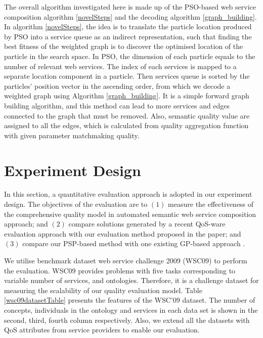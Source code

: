 \documentclass{llncs}
\begin{document}
The overall algorithm investigated here is made up of the PSO-based web service composition algorithm \ref{novelSteps} and the decoding algorithm \ref{graph_building}. In algorithm \ref{novelSteps}, the idea is to translate the particle location produced by PSO into a service queue as an indirect representation, such that finding the best fitness of the weighted graph is to discover the optimised location of the particle in the search space. In PSO, the dimension of each particle equals to the number of relevant web services. The index of each services is mapped to a separate location component in a particle. Then services queue is sorted by the particles' position vector in the ascending order, from which we decode a weighted graph using Algorithm \ref{graph_building}. It is a simple forward graph building algorithm, and this method can lead to more services and edges connected to the graph that must be removed. Also, semantic quality value are assigned to all the edges, which is calculated from quality aggregation function with given parameter matchmaking quality.


\section{Experiment Design}\label{experiment_design}
In this section, a quantitative evaluation approach is adopted in our experiment design. The objectives of the evaluation are to $(1)$ measure the effectiveness of the comprehensive quality model in automated semantic web service composition approach; and $(2)$ compare solutions generated by a recent QoS-ware evaluation approach \cite{ma2015hybrid,da2016genetic} with our evaluation method proposed in the paper; and $(3)$ compare our PSP-based method with one existing GP-based approach \cite{ma2015hybrid}.


We utilise benchmark dataset web service challenge 2009 (WSC09) \cite{kona2009wsc} to perform the evaluation. WSC09 provides problems with five tasks corresponding to variable number of services, and ontologies. Therefore, it is a challenge dataset for measuring the scalability of our quality evaluation model. Table \ref{wsc09datasetTable} presents the features of the WSC’09 dataset. The number of concepts, individuals in the ontology and services in each data set is shown in the second, third, fourth column respectively. Also, we extend all the datasets with QoS attributes from service providers to enable our evaluation. 
\end{document}

